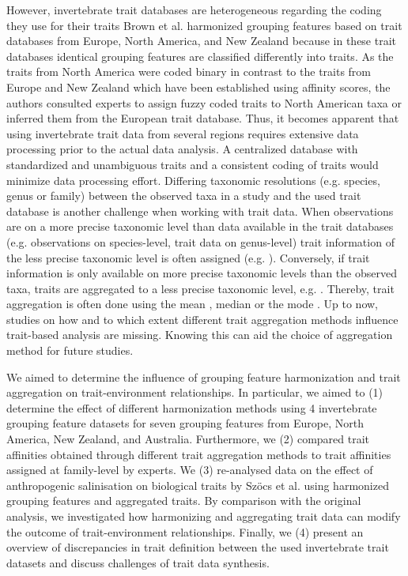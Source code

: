 \documentclass{article}
\begin{document}
However, invertebrate trait databases are heterogeneous regarding the coding they use for their traits \cite{culp_incorporating_2011} 
Brown et al. \cite{brown_functional_2018} harmonized grouping features based on trait databases from Europe, North America, and New Zealand because in these trait databases identical grouping features are classified differently into traits. As the traits from North America were coded binary in contrast to the traits from Europe and New Zealand which have been established using affinity scores, the authors consulted experts to assign fuzzy coded traits to North American taxa or inferred them from the European trait database. Thus, it becomes apparent that using invertebrate trait data from several regions requires extensive data processing prior to the actual data analysis. A centralized database with standardized and unambiguous traits and a consistent coding of traits would minimize data processing effort.
Differing taxonomic resolutions (e.g. species, genus or family) between the observed taxa in a study and the used trait database is another challenge when working with trait data. When observations are on a more precise taxonomic level than data available in the trait databases (e.g. observations on species-level, trait data on genus-level) trait information of the less precise taxonomic level is often assigned (e.g. \cite{szocs_effects_2014, vos_taxonomic_2017}). Conversely, if trait information is only available on more precise taxonomic levels than the observed taxa, traits are aggregated to a less precise taxonomic level, e.g. \cite{poff_functional_2006, szocs_effects_2014, piliere_a._f._h._importance_2016, aspin_extreme_2019}. Thereby, trait aggregation is often done using the mean \cite{magliozzi_functional_2019}, median \cite{szocs_effects_2014} or the mode \cite{piliere_a._f._h._importance_2016}. Up to now, studies on how and to which extent different trait aggregation methods influence trait-based analysis are missing. Knowing this can aid the choice of aggregation method for future studies.

We aimed to determine the influence of grouping feature harmonization and trait aggregation on trait-environment relationships. In particular, we aimed to (1) determine the effect of different harmonization methods using 4 invertebrate grouping feature datasets for seven grouping features from Europe, North America, New Zealand, and Australia. Furthermore, we (2) compared trait affinities obtained through different trait aggregation methods to trait affinities assigned at family-level by experts. We (3) re-analysed data on the effect of anthropogenic salinisation on biological traits by Szöcs et al. \cite{szocs_effects_2014} using harmonized grouping features and aggregated traits. By comparison with the original analysis, we investigated how harmonizing and aggregating trait data can modify the outcome of trait-environment relationships. Finally, we (4) present an overview of discrepancies in trait definition between the used invertebrate trait datasets and discuss challenges of trait data synthesis.
\end{document}
